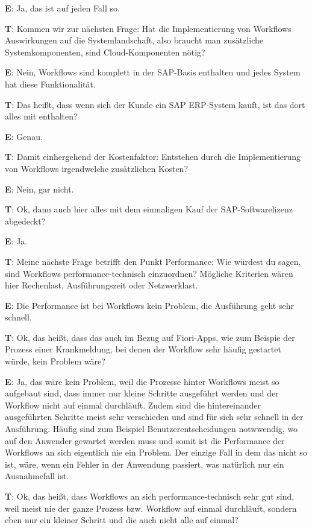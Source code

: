 \begin{list}{X:}{\setlength{\labelsep}{5mm}}
    \item[\textbf{E}:] Ja, das ist auf jeden Fall so.
    \item[\textbf{T}:] Kommen wir zur nächsten Frage: Hat die Implementierung von Workflows Auswirkungen auf die Systemlandschaft, also braucht man zusätzliche Systemkomponenten, sind Cloud-Komponenten nötig?
    \item[\textbf{E}:] Nein, Workflows sind komplett in der SAP-Basis enthalten und jedes System hat diese Funktionalität.
    \item[\textbf{T}:] Das hei{\ss}t, dass wenn sich der Kunde ein SAP ERP-System kauft, ist das dort alles mit enthalten?
    \item[\textbf{E}:] Genau.
    \item[\textbf{T}:] Damit einhergehend der Kostenfaktor: Entstehen durch die Implementierung von Workflows irgendwelche zusätzlichen Kosten?
    \item[\textbf{E}:] Nein, gar nicht.
    \item[\textbf{T}:] Ok, dann auch hier alles mit dem einmaligen Kauf der SAP-Softwarelizenz abgedeckt?
    \item[\textbf{E}:] Ja.
    \item[\textbf{T}:] Meine nächste Frage betrifft den Punkt Performance: Wie würdest du sagen, sind Workflows performance-technisch einzuordnen? Mögliche Kriterien wären hier Rechenlast, Ausführungszeit oder Netzwerklast.
    \item[\textbf{E}:] Die Performance ist bei Workflows kein Problem, die Ausführung geht sehr schnell.
    \item[\textbf{T}:] Ok, das heißt, dass das auch im Bezug auf Fiori-Apps, wie zum Beispie der Prozess einer Krankmeldung, bei denen der Workflow sehr häufig gestartet würde, kein Problem wäre?
    \item[\textbf{E}:] Ja, das wäre kein Problem, weil die Prozesse hinter Workflows meist so aufgebaut sind, dass immer nur kleine Schritte ausgeführt werden und der Workflow nicht auf einmal durchläuft. Zudem sind die hintereinander ausgeführten Schritte meist sehr verschieden und sind für sich sehr schnell in der Ausführung. Häufig sind zum Beispiel Benutzerentscheidungen notwwendig, wo auf den Anwender gewartet werden muss und somit ist die Performance der Workflows an sich eigentlich nie ein Problem. Der einzige Fall in dem das nicht so ist, wäre, wenn ein Fehler in der Anwendung passiert, was natürlich nur ein Ausnahmefall ist.
    \item[\textbf{T}:] Ok, das heißt, dass Workflows an sich performance-technisch sehr gut sind, weil meist nie der ganze Prozess bzw. Workflow auf einmal durchläuft, sondern eben nur ein kleiner Schritt und die auch nicht alle auf einmal?

\end{list}
